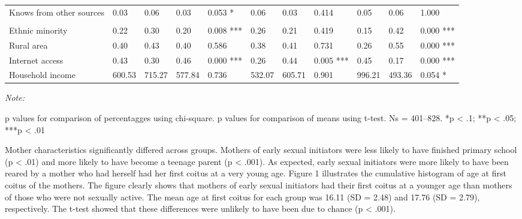 \documentclass[
]{article}
\begin{document}
\begin{landscape}
\begin{table}[!h]
{\begin{threeparttable}
\begin{tabular}[t]{lllllllllll}
\hspace{1em}Knows from other sources & 0.03 & 0.06 & 0.03 & 0.053  * & 0.06 & 0.03 & 0.414 & 0.05 & 0.06 & 1.000\\
\addlinespace[0.8em]
\multicolumn{11}{l}{\textit{Household-related variables}}\\
\hspace{1em}Ethnic minority & 0.22 & 0.30 & 0.20 & 0.008 *** & 0.26 & 0.21 & 0.419 & 0.15 & 0.42 & 0.000 ***\\
\hspace{1em}Rural area & 0.40 & 0.43 & 0.40 & 0.586 & 0.38 & 0.41 & 0.731 & 0.26 & 0.55 & 0.000 ***\\
\hspace{1em}Internet access & 0.43 & 0.30 & 0.46 & 0.000 *** & 0.26 & 0.44 & 0.005 *** & 0.45 & 0.17 & 0.000 ***\\
\hspace{1em}Household income & 600.53 & 715.27 & 577.84 & 0.736 & 532.07 & 605.71 & 0.901 & 996.21 & 493.36 & 0.054  *\\
\bottomrule
\end{tabular}
\begin{tablenotes}[para]
\item \textit{Note: } 
\item p values for comparison of percentagges using chi-square. p values for comparison of means using t-test. Ns = 401–828. *p < .1; **p < .05; ***p < .01
\end{tablenotes}
\end{threeparttable}}
\end{table}
\end{landscape}
\newpage

Mother characteristics significantly differed across groups. Mothers of
early sexual initiators were less likely to have finished primary school
(p \textless{} .01) and more likely to have become a teenage parent (p
\textless{} .001). As expected, early sexual initiators were more likely
to have been reared by a mother who had herself had her first coitus at
a very young age. Figure 1 illustrates the cumulative histogram of age
at first coitus of the mothers. The figure clearly shows that mothers of
early sexual initiators had their first coitus at a younger age than
mothers of those who were not sexually active. The mean age at first
coitus for each group was 16.11 (SD = 2.48) and 17.76 (SD = 2.79),
respectively. The t-test showed that these differences were unlikely to
have been due to chance (p \textless{} .001).
\end{document}
